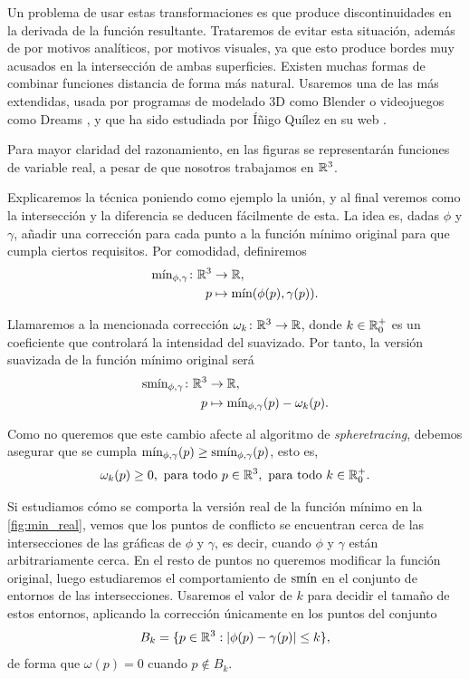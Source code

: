 Un problema de usar estas transformaciones es que produce discontinuidades en la derivada de la función resultante. Trataremos de evitar esta situación, además de por motivos analíticos, por motivos visuales, ya que esto produce bordes muy acusados en la intersección de ambas superficies. Existen muchas formas de combinar funciones distancia de forma más natural. Usaremos una de las más extendidas, usada por programas de modelado 3D como Blender \cite{repo:blender} o videojuegos como Dreams \cite{game:dreams}, y que ha sido estudiada por Íñigo Quílez en su web \cite{article:smooth}.

\begin{observacion}
    Para mayor claridad del razonamiento, en las figuras se representarán funciones de variable real, a pesar de que nosotros trabajamos en $\R^3$.
\end{observacion}

Explicaremos la técnica poniendo como ejemplo la unión, y al final veremos como la intersección y la diferencia se deducen fácilmente de esta. La idea es, dadas $\phi$ y $\gamma$, añadir una corrección para cada punto a la función mínimo original para que cumpla ciertos requisitos. Por comodidad, definiremos 
\begin{align*}
      \Min_{\phi,\gamma}\colon \R^3 &\to \R,\\
      p &\mapsto \Min(\phi(p),\gamma(p)).
\end{align*}

Llamaremos a la mencionada corrección $\omega_k\colon \R^3\to\R$, donde $k\in \R_0^+$ es un coeficiente que controlará la intensidad del suavizado. Por tanto, la versión suavizada de la función mínimo original será
\begin{align*}
      \smin_{\phi,\gamma}\colon \R^3 &\to \R,\\
      p &\mapsto \Min_{\phi,\gamma}(p) - \omega_k(p).
\end{align*}

Como no queremos que este cambio afecte al algoritmo de \textit{spheretracing}, debemos asegurar que se cumpla $\Min_{\phi,\gamma}(p)\ge \smin_{\phi,\gamma}(p)$, esto es,
\begin{equation*}
\omega_k(p)\ge 0,\ \text{para todo } p\in \R^3,\ \text{para todo } k\in \R^+_0.
\end{equation*}

Si estudiamos cómo se comporta la versión real de la función mínimo en la \autoref{fig:min_real}, vemos que los puntos de conflicto se encuentran cerca de las intersecciones de las gráficas de $\phi$ y $\gamma$, es decir, cuando $\phi$ y $\gamma$ están arbitrariamente cerca. En el resto de puntos no queremos modificar la función original, luego estudiaremos el comportamiento de $\smin$ en el conjunto de entornos de las intersecciones. Usaremos el valor de $k$ para decidir el tamaño de estos entornos, aplicando la corrección únicamente en los puntos del conjunto
\begin{equation*}
    B_{k} = \{p\in\R^3 : |\phi(p)-\gamma(p)| \le k\},
\end{equation*}
de forma que $\omega(p) = 0$ cuando $p\notin B_{k}$.\newline

